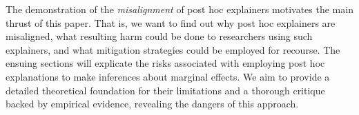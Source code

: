 \documentclass[12pt]{article}  %
\begin{document}
The demonstration of the \textit{misalignment} %
of post hoc explainers  motivates the main thrust of this paper. That is, we want to find out why post hoc explainers are misaligned, what resulting harm could be done to researchers using such explainers, and what mitigation strategies could be employed for recourse. 
The ensuing sections will explicate the risks associated with employing post hoc explanations to make inferences about marginal effects. We aim to provide a detailed theoretical foundation for their limitations and a thorough critique backed by empirical evidence, revealing the dangers of this approach.
\end{document}
